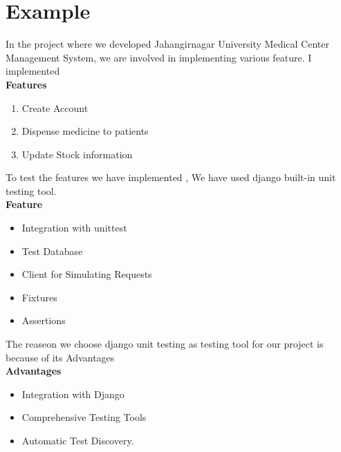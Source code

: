 \documentclass[a4paper,12pt]{article}
\begin{document}
\section{Example}
In the project where we developed  Jahangirnagar University Medical Center Management System, we are involved
in implementing various feature. I implemented \\
\textbf{Features}
\begin{enumerate}
    \item Create Account
    \item Dispense medicine to patients
    \item Update Stock information
\end{enumerate}
To test the features we have implemented , We have used django built-in unit testing tool. \\
\textbf{Feature}
\begin{itemize}
    \item Integration with unittest
    \item Test Database
    \item Client for Simulating Requests
    \item Fixtures
    \item Assertions
\end{itemize}
The reaseon we choose django unit testing as testing tool for our project is because of its Advantages \\
\textbf{Advantages}
\begin{itemize}
    \item Integration with Django
    \item Comprehensive Testing Tools
    \item Automatic Test Discovery.
\end{itemize}
\end{document}

